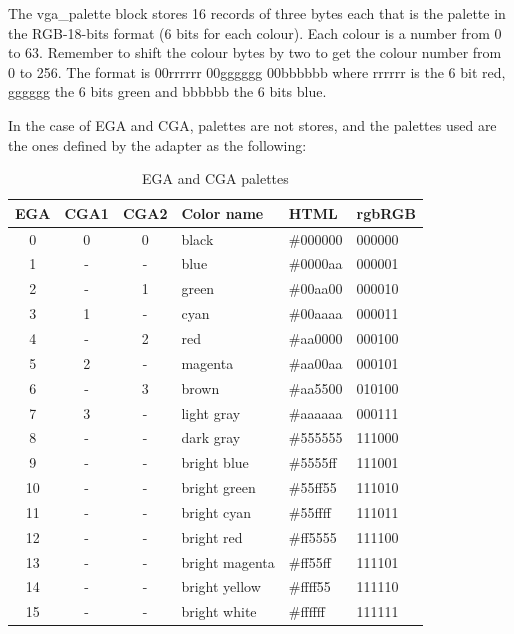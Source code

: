 \documentclass{article}
\begin{document}
 The vga\_palette block stores 16 records of three bytes each that is the
 palette in the RGB-18-bits format (6 bits for each colour). Each colour is
 a number from 0 to 63. Remember to shift the colour bytes by two to get
 the colour number from 0 to 256. The format is 00rrrrrr 00gggggg 00bbbbbb
 where rrrrrr is the 6 bit red, gggggg the 6 bits green and bbbbbb the 6
 bits blue.
 
 In the case of EGA and CGA, palettes are not stores, and the palettes used
 are the ones defined by the adapter as the following:
 
\begin{table}

\begin{tabular}{ccclll}
\hline
  EGA & CGA1 & CGA2  & Color name      &  HTML     & rgbRGB \\
\hline
  0   & 0    & 0     & black           & \#000000  & 000000 \\
  1   & -    & -     & blue            & \#0000aa  & 000001 \\
  2   & -    & 1     & green           & \#00aa00  & 000010 \\
  3   & 1    & -     & cyan            & \#00aaaa  & 000011 \\
  4   & -    & 2     & red             & \#aa0000  & 000100 \\
  5   & 2    & -     & magenta         & \#aa00aa  & 000101 \\
  6   & -    & 3     & brown           & \#aa5500  & 010100 \\
  7   & 3    & -     & light gray      & \#aaaaaa  & 000111 \\
  8   & -    & -     & dark gray       & \#555555  & 111000 \\
  9   & -    & -     & bright blue     & \#5555ff  & 111001 \\
  10  & -    & -     & bright green    & \#55ff55  & 111010 \\
  11  & -    & -     & bright cyan     & \#55ffff  & 111011 \\
  12  & -    & -     & bright red      & \#ff5555  & 111100 \\
  13  & -    & -     & bright magenta  & \#ff55ff  & 111101 \\
  14  & -    & -     & bright yellow   & \#ffff55  & 111110 \\
  15  & -    & -     & bright white    & \#ffffff  & 111111 \\
\hline
\end{tabular}
\caption{EGA and CGA palettes}
\end{table}
\end{document}
